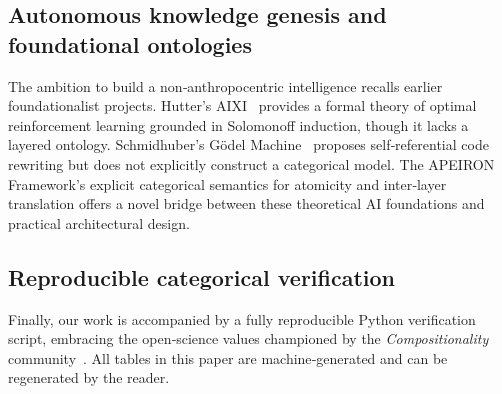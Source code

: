 \subsection{Autonomous knowledge genesis and foundational ontologies}
The ambition to build a non‑anthropocentric intelligence recalls earlier foundationalist projects.
Hutter's AIXI~\cite{Hutter2005} provides a formal theory of optimal reinforcement learning grounded in Solomonoff induction, though it lacks a layered ontology.
Schmidhuber's Gödel Machine~\cite{Schmidhuber2007} proposes self‑referential code rewriting but does not explicitly construct a categorical model.
The APEIRON Framework’s explicit categorical semantics for atomicity and inter‑layer translation offers a novel bridge between these theoretical AI foundations and practical architectural design.

\subsection{Reproducible categorical verification}
Finally, our work is accompanied by a fully reproducible Python verification script, embracing the open‑science values championed by the \emph{Compositionality} community~\cite{FongSpivak2019}. All tables in this paper are machine‑generated and can be regenerated by the reader.